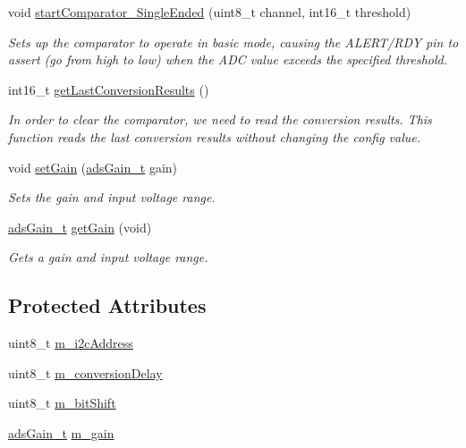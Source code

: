 \begin{DoxyCompactItemize}
void \hyperlink{class_adafruit___a_d_s1015_aecd30775d943ea9d9cff0e3485926596}{start\+Comparator\+\_\+\+Single\+Ended} (uint8\+\_\+t channel, int16\+\_\+t threshold)
\begin{DoxyCompactList}\small\item\em Sets up the comparator to operate in basic mode, causing the A\+L\+E\+R\+T/\+R\+DY pin to assert (go from high to low) when the A\+DC value exceeds the specified threshold. \end{DoxyCompactList}\item 
int16\+\_\+t \hyperlink{class_adafruit___a_d_s1015_ad8f36d80847020778425107f6451a8c2}{get\+Last\+Conversion\+Results} ()
\begin{DoxyCompactList}\small\item\em In order to clear the comparator, we need to read the conversion results. This function reads the last conversion results without changing the config value. \end{DoxyCompactList}\item 
void \hyperlink{class_adafruit___a_d_s1015_a399441eace686975ff22937cbe45cc50}{set\+Gain} (\hyperlink{_cool_adafruit___a_d_s1015_8h_a3d6c0e15829a207b9155890811fa4781}{ads\+Gain\+\_\+t} gain)
\begin{DoxyCompactList}\small\item\em Sets the gain and input voltage range. \end{DoxyCompactList}\item 
\hyperlink{_cool_adafruit___a_d_s1015_8h_a3d6c0e15829a207b9155890811fa4781}{ads\+Gain\+\_\+t} \hyperlink{class_adafruit___a_d_s1015_a6232d089aaa82226bc34623fdf92237c}{get\+Gain} (void)
\begin{DoxyCompactList}\small\item\em Gets a gain and input voltage range. \end{DoxyCompactList}\end{DoxyCompactItemize}
\subsection*{Protected Attributes}
\begin{DoxyCompactItemize}
\item 
uint8\+\_\+t \hyperlink{class_adafruit___a_d_s1015_a2186993621a7973256d47f086c74035d}{m\+\_\+i2c\+Address}
\item 
uint8\+\_\+t \hyperlink{class_adafruit___a_d_s1015_aa3a29a64a6705fce1fee21d73c642a0e}{m\+\_\+conversion\+Delay}
\item 
uint8\+\_\+t \hyperlink{class_adafruit___a_d_s1015_ab238ce17112a78db2be4ea14d57fb114}{m\+\_\+bit\+Shift}
\item 
\hyperlink{_cool_adafruit___a_d_s1015_8h_a3d6c0e15829a207b9155890811fa4781}{ads\+Gain\+\_\+t} \hyperlink{class_adafruit___a_d_s1015_a8db90fe03d55a18246984ba2ba5e7f32}{m\+\_\+gain}
\end{DoxyCompactItemize}


